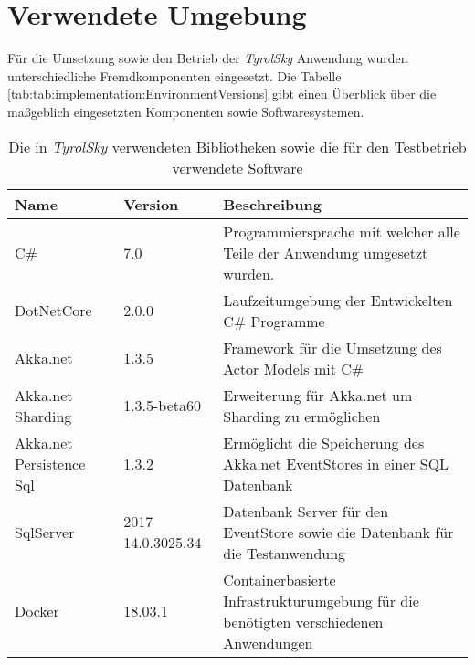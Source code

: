 \section{Verwendete Umgebung}
Für die Umsetzung sowie den Betrieb der \textit{TyrolSky} Anwendung wurden unterschiedliche Fremdkomponenten eingesetzt. Die Tabelle \ref{tab:tab:implementation:EnvironmentVersions} gibt einen Überblick über die maßgeblich eingesetzten Komponenten sowie Softwaresystemen. 

\begin{table}[h]
    \centering
    \begin{tabular}{llp{6.5cm}}
    Name            & Version       & Beschreibung \\ \hline
    C\#          & 7.0               &  Programmiersprache mit welcher alle Teile der Anwendung umgesetzt wurden. \\
    DotNetCore      & 2.0.0             &  Laufzeitumgebung der Entwickelten C\# Programme \\
    Akka.net        & 1.3.5             & Framework für die Umsetzung des Actor Models mit C\# \\
    Akka.net Sharding & 1.3.5-beta60    & Erweiterung für Akka.net um Sharding zu ermöglichen \\
    Akka.net Persistence Sql & 1.3.2    & Ermöglicht die Speicherung des Akka.net EventStores in einer SQL Datenbank\\
    SqlServer       & 2017 14.0.3025.34 & Datenbank Server für den EventStore sowie die Datenbank für die Testanwendung\\
    Docker          & 18.03.1           & Containerbasierte Infrastrukturumgebung für die benötigten verschiedenen Anwendungen\\
    \end{tabular}
    \caption{Die in \textit{TyrolSky} verwendeten Bibliotheken sowie die für den Testbetrieb verwendete Software}
    \label{tab:implementation:EnvironmentVersions}
    \end{table}